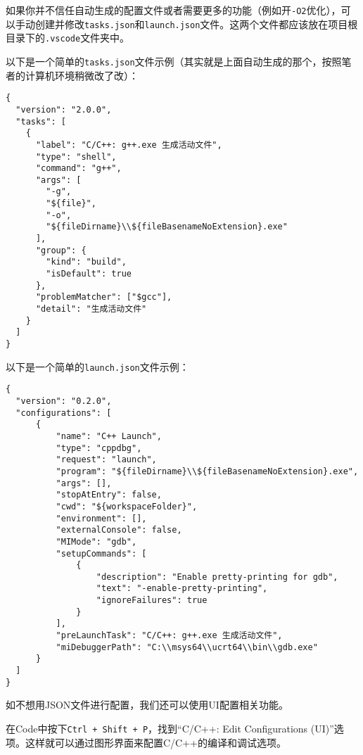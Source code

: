 \documentclass[../main.tex]{subfiles}
\begin{document}
如果你并不信任自动生成的配置文件或者需要更多的功能（例如开\texttt{-O2}优化），可以手动创建并修改\texttt{tasks.json}和\texttt{launch.json}文件。这两个文件都应该放在项目根目录下的\texttt{.vscode}文件夹中。

以下是一个简单的\texttt{tasks.json}文件示例（其实就是上面自动生成的那个，按照笔者的计算机环境稍微改了改）：

\begin{lstlisting}
{
  "version": "2.0.0",
  "tasks": [
    {
      "label": "C/C++: g++.exe 生成活动文件",
      "type": "shell",
      "command": "g++",
      "args": [
        "-g",
        "${file}",
        "-o",
        "${fileDirname}\\${fileBasenameNoExtension}.exe"
      ],
      "group": {
        "kind": "build",
        "isDefault": true
      },
      "problemMatcher": ["$gcc"],
      "detail": "生成活动文件"
    }
  ]
}
\end{lstlisting}

以下是一个简单的\texttt{launch.json}文件示例：

\begin{lstlisting}
{
  "version": "0.2.0",
  "configurations": [
      {
          "name": "C++ Launch",
          "type": "cppdbg",
          "request": "launch",
          "program": "${fileDirname}\\${fileBasenameNoExtension}.exe",
          "args": [],
          "stopAtEntry": false,
          "cwd": "${workspaceFolder}",
          "environment": [],
          "externalConsole": false,
          "MIMode": "gdb",
          "setupCommands": [
              {
                  "description": "Enable pretty-printing for gdb",
                  "text": "-enable-pretty-printing",
                  "ignoreFailures": true
              }
          ],
          "preLaunchTask": "C/C++: g++.exe 生成活动文件",
          "miDebuggerPath": "C:\\msys64\\ucrt64\\bin\\gdb.exe"
      }
  ]
}
\end{lstlisting}

如不想用JSON文件进行配置，我们还可以使用UI配置相关功能。

在Code中按下\texttt{Ctrl + Shift + P}，找到“C/C++: Edit Configurations (UI)”选项。这样就可以通过图形界面来配置C/C++的编译和调试选项。
\end{document}
